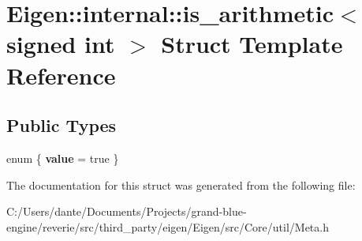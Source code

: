 \hypertarget{struct_eigen_1_1internal_1_1is__arithmetic_3_01signed_01int_01_4}{}\section{Eigen\+::internal\+::is\+\_\+arithmetic$<$ signed int $>$ Struct Template Reference}
\label{struct_eigen_1_1internal_1_1is__arithmetic_3_01signed_01int_01_4}
\subsection*{Public Types}
\begin{DoxyCompactItemize}
\item 
\mbox{\label{struct_eigen_1_1internal_1_1is__arithmetic_3_01signed_01int_01_4_a22dc702ea10319cce0bb74dfb41bd751}} 
enum \{ {\bfseries value} = true
 \}
\end{DoxyCompactItemize}


The documentation for this struct was generated from the following file\+:\begin{DoxyCompactItemize}
\item 
C\+:/\+Users/dante/\+Documents/\+Projects/grand-\/blue-\/engine/reverie/src/third\+\_\+party/eigen/\+Eigen/src/\+Core/util/Meta.\+h\end{DoxyCompactItemize}
